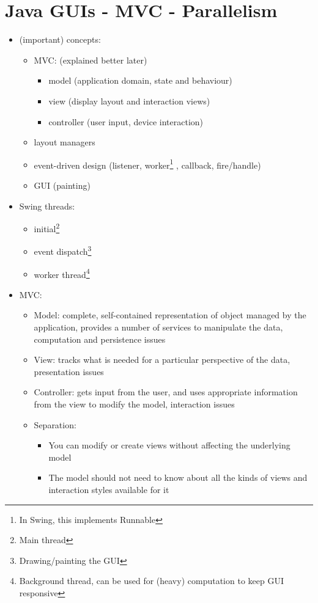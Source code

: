 \documentclass[a4paper]{article}
\begin{document}
\section{Java GUIs - MVC - Parallelism}
\begin{itemize}
\item (important) concepts: 
\begin{itemize}
 \item MVC: (explained better later)
\begin{itemize}
\item model (application domain, state and behaviour)
\item view (display layout and interaction views)
\item controller (user input, device interaction)
\end{itemize}
\item layout managers
\item event-driven design  (listener, worker\footnote{In Swing, this implements Runnable} , callback, fire/handle)
\item GUI (painting)
\end{itemize}
\item Swing threads: 
\begin{itemize}
\item initial\footnote{Main thread}
\item event dispatch\footnote{Drawing/painting the GUI}
\item worker thread\footnote{Background thread, can be used for (heavy) computation to keep GUI responsive}
\end{itemize}
\item MVC: 
\begin{itemize}
\item Model: complete, self-contained representation of object managed by the application, provides a number of services to manipulate the data, computation and persistence issues
\item View: tracks what is needed for a particular perspective of the data, presentation issues
\item Controller: gets input from the user, and uses appropriate information from the view to modify the model, interaction issues
\item Separation: 
\begin{itemize}
\item You can modify or create views without affecting the underlying model
\item The model should not need to know about all the kinds of views and interaction styles available for it
\end{itemize}
\end{itemize}
\end{itemize}
\end{document}
